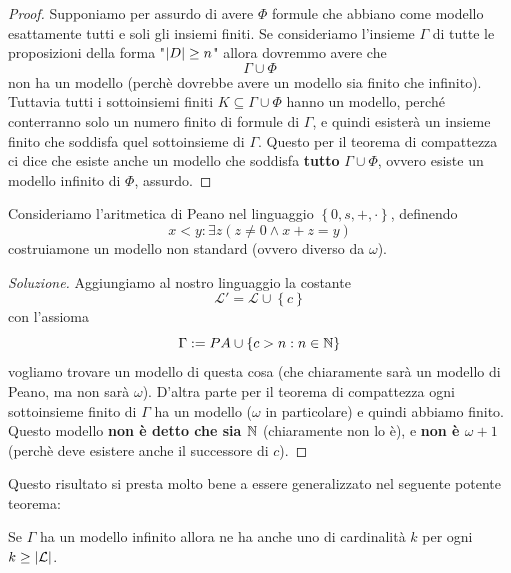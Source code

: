 \documentclass[11pt]{scrartcl}
\begin{document}
 	\begin{proof}
 		Supponiamo per assurdo di avere $\Phi$ formule che abbiano come modello esattamente tutti e soli gli insiemi finiti. Se consideriamo l'insieme $\Gamma$ di tutte le proposizioni della forma "$\left\lvert D \right\rvert\ge n$" allora dovremmo avere che 
 		$$\Gamma\cup \Phi$$
 		non ha un modello (perchè dovrebbe avere un modello sia finito che infinito). Tuttavia tutti i sottoinsiemi finiti $K\subseteq \Gamma\cup \Phi$ hanno un modello, perché conterranno solo un numero finito di formule di $\Gamma$, e quindi esisterà un insieme finito che soddisfa quel sottoinsieme di $\Gamma$. Questo per il teorema di compattezza ci dice che esiste anche un modello che soddisfa \textbf{tutto} $\Gamma\cup \Phi$, ovvero esiste un modello infinito di $\Phi$, assurdo.
 	\end{proof}
 	\begin{example}
 		Consideriamo l'aritmetica di Peano nel linguaggio $\left\{0,s,+,\cdot\right\}$, definendo 
 		$$x<y:\exists z\left(z\ne 0 \land x+z=y\right)$$
 		costruiamone un modello non standard (ovvero diverso da $\omega$).
 	\end{example}
 	\begin{proof}[Soluzione]
 		Aggiungiamo al nostro linguaggio la costante
 		$$\mathcal{L}'=\mathcal{L}\cup \left\{c\right\}$$
 		con l'assioma
 		$$\Gamma:=PA\cup \left\{c>n:n\in \mathbb N\right\}$$
 		vogliamo trovare un modello di questa cosa (che chiaramente sarà un modello di Peano, ma non sarà $\omega$). D'altra parte per il teorema di compattezza ogni sottoinsieme finito di $\Gamma$ ha un modello ($\omega$ in particolare) e quindi abbiamo finito. Questo modello \textbf{non è detto che sia $\mathbb N$} (chiaramente non lo è), e \textbf{non è $\omega+1$} (perchè deve esistere anche il successore di $c$).
 	\end{proof}
 	Questo risultato si presta molto bene a essere generalizzato nel seguente potente teorema:
 	\begin{theorem}
 		Se $\Gamma$ ha un modello infinito allora ne ha anche uno di cardinalità $k$ per ogni $k\ge \left\lvert \mathcal{L} \right\rvert$.
 	\end{theorem}
\end{document}

